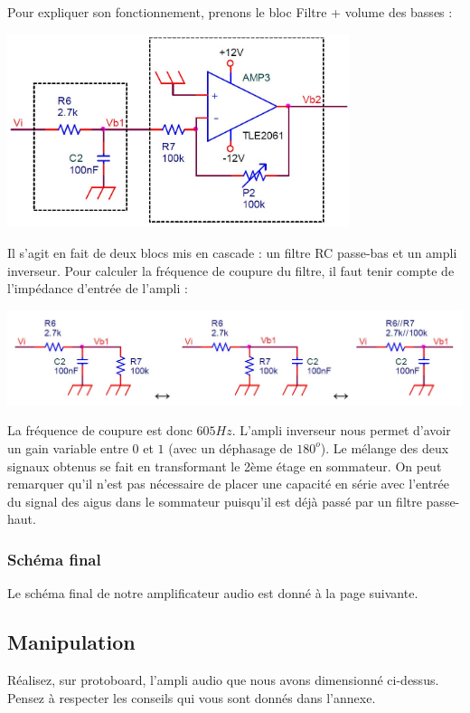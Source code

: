 \documentclass{../template/labo}
\begin{document}
Pour expliquer son fonctionnement, prenons le bloc Filtre + volume des basses :
\begin{center}
\includegraphics[width=10cm]{figures/AOPfiltrebasse}
\end{center}
Il s'agit en fait de deux blocs mis en cascade : un filtre RC passe-bas et un ampli inverseur.
Pour calculer la fréquence de coupure du filtre, il faut tenir compte de l'impédance d'entrée de l'ampli :
\begin{center}
\includegraphics[width=14cm]{figures/AOPfiltreRC}
\end{center}

La fréquence de coupure est donc $605Hz$.
L'ampli inverseur nous permet d'avoir un gain variable entre $0$ et $1$ (avec un déphasage de $180^{o}$).
Le mélange des deux signaux obtenus se fait en transformant le 2ème étage en sommateur. On peut remarquer qu'il n'est pas nécessaire de placer une capacité en série avec l'entrée du signal des aigus dans le sommateur puisqu'il est déjà passé par un filtre passe-haut.

\subsubsection{Schéma final}
Le schéma final de notre amplificateur audio est donné à la page suivante.

\subsection{Manipulation}
\Question
{
Réalisez, sur protoboard, l'ampli audio que nous avons dimensionné ci-dessus. Pensez à respecter les conseils qui vous sont donnés dans l'annexe.
}
{}
\end{document}
